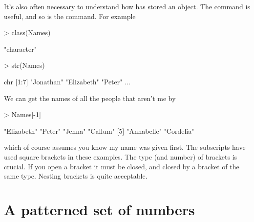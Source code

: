 It's also often necessary to understand how \R{} has stored an object. The  command is useful, and so is the  command. For example 
\begin{Schunk}
\begin{Sinput}
> class(Names) 
\end{Sinput}
\begin{Soutput}
[1] "character"
\end{Soutput}
\begin{Sinput}
> str(Names) 
\end{Sinput}
\begin{Soutput}
 chr [1:7] "Jonathan" "Elizabeth" "Peter" ...
\end{Soutput}
\end{Schunk}
We can get the names of all the people that aren't me by 
\begin{Schunk}
\begin{Sinput}
> Names[-1] 
\end{Sinput}
\begin{Soutput}
[1] "Elizabeth" "Peter"     "Jenna"     "Callum"   
[5] "Annabelle" "Cordelia" 
\end{Soutput}
\end{Schunk}
which of course assumes you know my name was given first. The subscripts have used square brackets in these examples. The type (and number) of brackets is crucial. If you open a bracket it must be closed, and closed by a bracket of the same type. Nesting brackets is quite acceptable. 
 
 
\section{A patterned set of numbers} 
 
